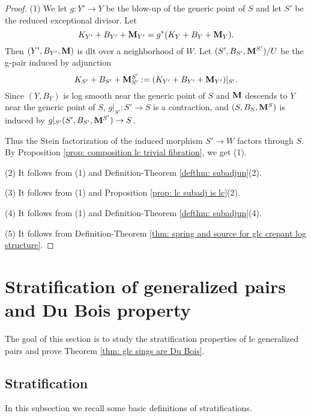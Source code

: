 \documentclass[11pt]{amsart}
\numberwithin{equation}{section}
\newcommand{\Mm}{{\bf{M}}}
\theoremstyle{definition}
\theoremstyle{definition}
\theoremstyle{definition}
\begin{document}
\begin{proof}
(1) We let $g: Y'\rightarrow Y$ be the blow-up of the generic point of $S$ and let $S'$ be the reduced exceptional divisor. Let 
$$K_{Y'}+B_{Y'}+\Mm_{Y'}=g^*(K_Y+B_Y+\Mm_Y).$$
Then $(Y',B_{Y'},\Mm)$ is dlt over a neighborhood of $W$.  Let $(S',B_{S'},\Mm^{S'})/U$ be the g-pair induced by adjunction
$$K_{S'}+B_{S'}+\Mm^{S'}_{S'}:=(K_{Y'}+B_{Y'}+\Mm_{Y'})|_{S'}.$$
Since $(Y,B_Y)$ is log smooth near the generic point of $S$ and $\Mm$ descends to $Y$ near the generic point of $S$, $g|_{S'}: S'\rightarrow S$ is a contraction, and $(S,B_S,\Mm^S)$ is induced by $g|_{S'} (S',B_{S'},\Mm^{S'})\rightarrow S$.

Thus the Stein factorization of the induced morphism $S'\rightarrow W$ factors through $S$. By Proposition \ref{prop: composition lc trivial fibration}, we get (1).

(2) It follows from (1) and Definition-Theorem \ref{defthm: subadjun}(2).

(3)  It follows from (1) and Proposition \ref{prop: lc subadj is lc}(2).

(4) It follows from (1) and Definition-Theorem \ref{defthm: subadjun}(4).

(5) It follows from Definition-Theorem \ref{thm: spring and source for glc crepant log structure}.
\end{proof}



\section{Stratification of generalized pairs and Du Bois property}\label{sec: du bois}

The goal of this section is to study the stratification properties of lc generalized pairs and prove Theorem \ref{thm: glc sings are Du Bois}.

\subsection{Stratification}

In this subsection we recall some basic definitions of stratifications.
\end{document}
